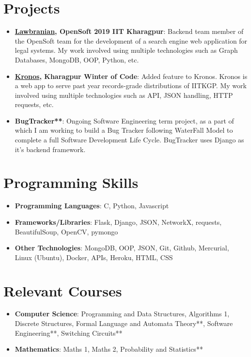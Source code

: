 \documentclass[letterpaper,11pt]{article}
\newcommand{\resumeItem}[2]{
  \item\small{
    \textbf{#1}{: #2 \vspace{-2pt}}
  }
}
\newcommand{\resumeSubItem}[2]{\resumeItem{#1}{#2}\vspace{-4pt}}
\newcommand{\resumeSubHeadingListStart}{\begin{itemize}[leftmargin=*]}
\newcommand{\resumeSubHeadingListEnd}{\end{itemize}}
\begin{document}
\section{Projects}
  \resumeSubHeadingListStart
    \resumeSubItem{\href{https://github.com/lbs-iitkgp/Opensoft-2019}{Lawbranian}, OpenSoft 2019 IIT Kharagpur}
      {Backend team member of the OpenSoft team for the development of a search engine web application for legal systems. My work involved using multiple technologies such as Graph Databases, MongoDB, OOP, Python, etc.}
    \resumeSubItem{\href{https://github.com/metakgp/Kronos}{Kronos}, Kharagpur Winter of Code}
      {Added feature to Kronos. Kronos is a web app to serve past year records-grade distributions of IITKGP. My work involved using multiple technologies such as API, JSON handling, HTTP requests, etc.}
    \resumeSubItem{BugTracker**}
      {Ongoing Software Engineering term project, as a part of which I am working to build a Bug Tracker following WaterFall Model to complete a full Software Development Life Cycle. BugTracker uses Django as it's backend framework.}
  \resumeSubHeadingListEnd

%
\section{Programming Skills}
 \resumeSubHeadingListStart
   \item{
     \textbf{Programming Languages}{: C, Python, Javascript}
     \hfill
   }
   \item{
     \textbf{Frameworks/Libraries}{: Flask, Django, JSON, NetworkX, requests, BeautifulSoup, OpenCV, pymongo}
     \hfill
   }
   \item{
     \textbf{Other Technologies}{: MongoDB, OOP, JSON, Git, Github, Mercurial, Linux (Ubuntu), Docker, APIs, Heroku, HTML, CSS}
     \hfill
   }
 \resumeSubHeadingListEnd


\section{Relevant Courses}
  \resumeSubHeadingListStart
  \item{
    \textbf{Computer Science}{: Programming and Data Structures, Algorithms 1, Discrete Structures, Formal Language and Automata Theory**, Software Engineering**, Switching Circuits** }
    \hfill
  }
  \item{  
    \textbf{Mathematics}{: Maths 1, Maths 2, Probability and Statistics**}
    \hfill
  }
  \resumeSubHeadingListEnd
\end{document}
